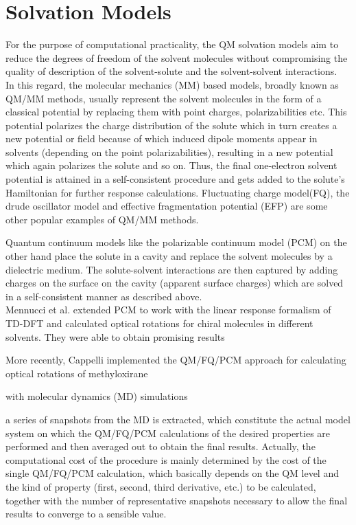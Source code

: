 \section{Solvation Models}
For the purpose of computational practicality, the QM solvation models aim to reduce the degrees of freedom of
the solvent molecules without compromising the quality of description of the solvent-solute and the solvent-solvent
interactions. \\
In this regard, the molecular mechanics (MM) based models, broadly known as QM/MM methods, usually represent the
solvent molecules in the form of a classical potential by replacing them with point charges, polarizabilities etc.\cite{}
This potential polarizes the charge distribution of the solute which in turn creates a new potential or field because of
which induced dipole moments appear in solvents (depending on the point polarizabilities), resulting in a new
potential which again polarizes the solute and so on. Thus, the final one-electron solvent potential is attained in a
self-consistent procedure and gets added to the solute's Hamiltonian for further response calculations. Fluctuating
charge model(FQ)\cite{}, the drude oscillator model\cite{} and effective fragmentation potential (EFP)\cite{} are some
other popular examples of QM/MM methods.

Quantum continuum models like the polarizable continuum model (PCM)\cite{}
on the other hand place the solute in a cavity and replace the solvent molecules by a dielectric medium. The
solute-solvent interactions are then captured by adding charges on the surface on the cavity (apparent surface charges)
which are solved in a self-consistent manner as described above.\\


Mennucci et al. extended PCM to work with the linear response formalism of TD-DFT\cite{Mennucci02}
and calculated optical rotations for chiral molecules in different solvents. They were able to obtain promising results

More recently, Cappelli implemented the
QM/FQ/PCM approach for calculating optical rotations of methyloxirane


with molecular dynamics (MD) simulations



 a series of snapshots from the MD is extracted, which constitute the actual model system on which the QM/FQ/PCM calculations of the desired properties are performed and then averaged out to obtain the final results. Actually, the computational cost of the procedure is mainly determined by the cost of the single QM/FQ/PCM calculation, which basically depends on the QM level and the kind of property (first, second, third derivative, etc.) to be calculated, together with the number of representative snapshots necessary to allow the final results to converge to a sensible value.



